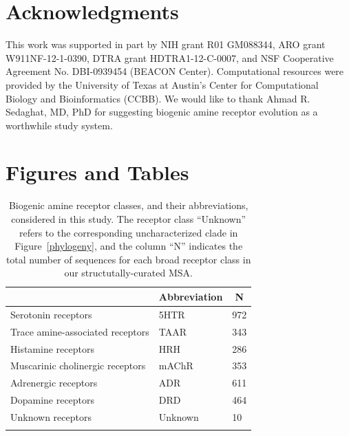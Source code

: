 \documentclass[fleqn,10pt]{wlpeerj}
\begin{document}
\section*{Acknowledgments}
This work was supported in part by NIH grant R01 GM088344, ARO grant W911NF-12-1-0390, DTRA grant HDTRA1-12-C-0007, and NSF Cooperative Agreement No. DBI-0939454 (BEACON Center).  Computational resources were provided by the University of Texas at Austin's Center for Computational Biology and Bioinformatics (CCBB). We would like to thank Ahmad R. Sedaghat, MD, PhD for suggesting biogenic amine receptor evolution as a worthwhile study system.





\newpage


\section*{Figures and Tables}


\vspace*{5cm}


\begin{table}[htbp]
	\centering
	\begin{tabular}{l l l}
		\hline\noalign{\smallskip}
		\multicolumn{1}{c}{Receptor Class} & \multicolumn{1}{c}{Abbreviation} & \multicolumn{1}{c}{N} \\
		\hline\noalign{\smallskip}
		Serotonin receptors & \quad 5HTR & 972  \\
		Trace amine-associated receptors & \quad TAAR & 343 \\
		Histamine receptors & \quad HRH & 286 \\
		Muscarinic cholinergic receptors & \quad mAChR & 353  \\
		Adrenergic receptors & \quad ADR & 611  \\
		Dopamine receptors & \quad DRD & 464 \\
		Unknown receptors & \quad Unknown & 10 \\
		\noalign{\smallskip}\hline\noalign{\smallskip} 
	\end{tabular}
	\caption{\label{tab:abbrev_count} Biogenic amine receptor classes, and their abbreviations, considered in this study. The receptor class ``Unknown'' refers to the corresponding uncharacterized clade in Figure~\ref{phylogeny}, and the column ``N'' indicates the total number of sequences for each broad receptor class in our structutally-curated MSA.}
\end{table}
\end{document}

